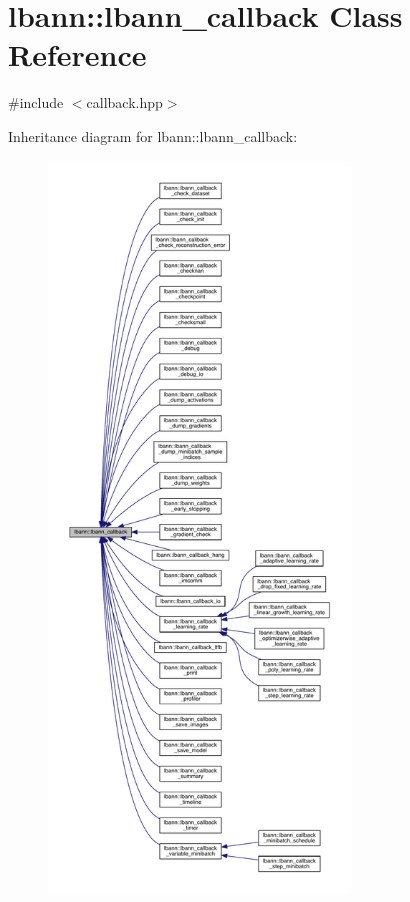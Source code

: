 \hypertarget{classlbann_1_1lbann__callback}{}\section{lbann\+:\+:lbann\+\_\+callback Class Reference}
\label{classlbann_1_1lbann__callback}


{\ttfamily \#include $<$callback.\+hpp$>$}



Inheritance diagram for lbann\+:\+:lbann\+\_\+callback\+:\nopagebreak
\begin{figure}[H]
\begin{center}
\leavevmode
\includegraphics[height=550pt]{classlbann_1_1lbann__callback__inherit__graph}
\end{center}
\end{figure}


